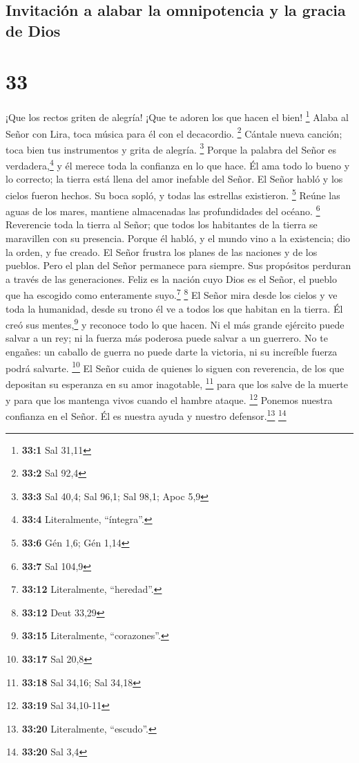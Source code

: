 \hypertarget{invitaciuxf3n-a-alabar-la-omnipotencia-y-la-gracia-de-dios}{%
\subsection{Invitación a alabar la omnipotencia y la gracia de
Dios}\label{invitaciuxf3n-a-alabar-la-omnipotencia-y-la-gracia-de-dios}}

\hypertarget{section-32}{%
\section{33}\label{section-32}}

 ¡Que los rectos griten de alegría! ¡Que te adoren los que
hacen el bien! \footnote{\textbf{33:1} Sal 31,11}  Alaba
al Señor con Lira, toca música para él con el decacordio. \footnote{\textbf{33:2}
  Sal 92,4}  Cántale nueva canción; toca bien tus
instrumentos y grita de alegría. \footnote{\textbf{33:3} Sal 40,4; Sal
  96,1; Sal 98,1; Apoc 5,9}  Porque la palabra del Señor
es verdadera,\footnote{\textbf{33:4} Literalmente, ``íntegra''.} y él
merece toda la confianza en lo que hace.  Él ama todo lo
bueno y lo correcto; la tierra está llena del amor inefable del Señor.
 El Señor habló y los cielos fueron hechos. Su boca sopló,
y todas las estrellas existieron. \footnote{\textbf{33:6} Gén 1,6; Gén
  1,14}  Reúne las aguas de los mares, mantiene
almacenadas las profundidades del océano. \footnote{\textbf{33:7} Sal
  104,9}  Reverencie toda la tierra al Señor; que todos
los habitantes de la tierra se maravillen con su presencia.
 Porque él habló, y el mundo vino a la existencia; dio la
orden, y fue creado.  El Señor frustra los planes de las
naciones y de los pueblos.  Pero el plan del Señor
permanece para siempre. Sus propósitos perduran a través de las
generaciones.  Feliz es la nación cuyo Dios es el Señor,
el pueblo que ha escogido como enteramente suyo.\footnote{\textbf{33:12}
  Literalmente, ``heredad''.} \footnote{\textbf{33:12} Deut 33,29}
 El Señor mira desde los cielos y ve toda la humanidad,
 desde su trono él ve a todos los que habitan en la
tierra.  Él creó sus mentes,\footnote{\textbf{33:15}
  Literalmente, ``corazones''.} y reconoce todo lo que hacen.
 Ni el más grande ejército puede salvar a un rey; ni la
fuerza más poderosa puede salvar a un guerrero.  No te
engañes: un caballo de guerra no puede darte la victoria, ni su
increíble fuerza podrá salvarte. \footnote{\textbf{33:17} Sal 20,8}
 El Señor cuida de quienes lo siguen con reverencia, de
los que depositan su esperanza en su amor inagotable, \footnote{\textbf{33:18}
  Sal 34,16; Sal 34,18}  para que los salve de la muerte
y para que los mantenga vivos cuando el hambre ataque. \footnote{\textbf{33:19}
  Sal 34,10-11}  Ponemos nuestra confianza en el Señor.
Él es nuestra ayuda y nuestro defensor.\footnote{\textbf{33:20}
  Literalmente, ``escudo''.} \footnote{\textbf{33:20} Sal 3,4}

